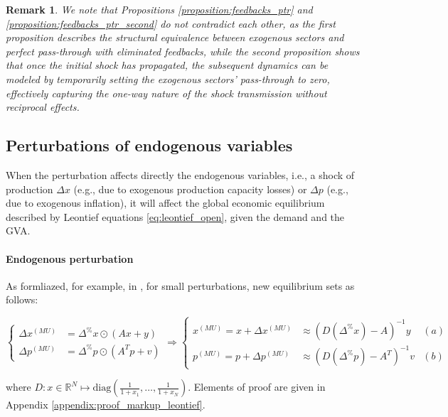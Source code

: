 \documentclass{article}
\newtheorem{remark}{Remark}
\begin{document}
\begin{remark}
We note that Propositions \ref{proposition:feedbacks_ptr} and \ref{proposition:feedbacks_ptr_second} do not contradict each other, as the first proposition describes the structural equivalence between exogenous sectors and perfect pass-through with eliminated feedbacks, while the second proposition shows that once the initial shock has propagated, the subsequent dynamics can be modeled by temporarily setting the exogenous sectors' pass-through to zero, effectively capturing the one-way nature of the shock transmission without reciprocal effects. 
\end{remark}

\subsection{Perturbations of endogenous variables}
\label{section:mark_up_framework}
When the perturbation affects directly the endogenous variables, i.e., a shock of production $\Delta x$ (e.g., due to exogenous production capacity losses) or $\Delta p$ (e.g., due to exogenous inflation), it will affect the global economic equilibrium described by Leontief equations \eqref{eq:leontief_open}, given the demand and the GVA. 

\paragraph{Endogenous perturbation} As formliazed, for example, in \cite{llop2008economic,mardones2020economic,desnos2023climate}, for small perturbations, new equilibrium sets as follows:

\begin{equation}
\label{eq:perturbed_endogenous_leontief}
    \left\{\begin{aligned} 
      \Delta x^{(MU)} &= \Delta^\% x \odot (Ax + y) \\ 
      \Delta p^{(MU)} &= \Delta^\% p \odot (A^T p + v)
    \end{aligned}\right. \Longrightarrow
    \left\{\begin{aligned}
     x^{(MU)} = x + \Delta x^{(MU)}  &\approx \left( D(\Delta^\% x) - A \right)^{-1}y   & (a)\\ 
     p^{(MU)} = p + \Delta p^{(MU)}  &\approx \left( D(\Delta^\% p) - A^T \right)^{-1}v  & (b)
    \end{aligned}\right. 
\end{equation}

\noindent where $D:x \in \mathbb{R}^N \mapsto \text{diag} \left( \frac{1}{1 + x_1}, \dots, \frac{1}{1 + x_N} \right)$. Elements of proof are given in Appendix \ref{appendix:proof_markup_leontief}. 
\end{document}
